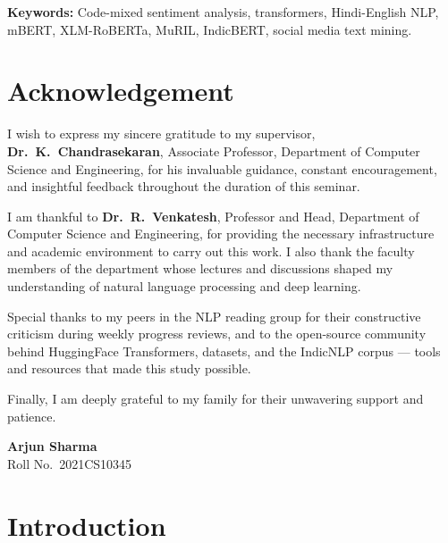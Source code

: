 \documentclass[12pt,a4paper]{report}
\begin{document}
\vspace{6pt}
\noindent\textbf{Keywords:} Code-mixed sentiment analysis, transformers, Hindi-English NLP, mBERT, XLM-RoBERTa, MuRIL, IndicBERT, social media text mining.

\chapter*{Acknowledgement}

I wish to express my sincere gratitude to my supervisor, \textbf{Dr.\ K.\ Chandrasekaran}, Associate Professor, Department of Computer Science and Engineering, for his invaluable guidance, constant encouragement, and insightful feedback throughout the duration of this seminar.

I am thankful to \textbf{Dr.\ R.\ Venkatesh}, Professor and Head, Department of Computer Science and Engineering, for providing the necessary infrastructure and academic environment to carry out this work. I also thank the faculty members of the department whose lectures and discussions shaped my understanding of natural language processing and deep learning.

Special thanks to my peers in the NLP reading group for their constructive criticism during weekly progress reviews, and to the open-source community behind HuggingFace Transformers, datasets, and the IndicNLP corpus — tools and resources that made this study possible.

Finally, I am deeply grateful to my family for their unwavering support and patience.

\vspace{12pt}
\begin{flushright}
\textbf{Arjun Sharma}\\[2pt]
{\small\color{graytext} Roll No.\ 2021CS10345}
\end{flushright}

\tableofcontents
\clearpage

\chapter{Introduction}
\end{document}
